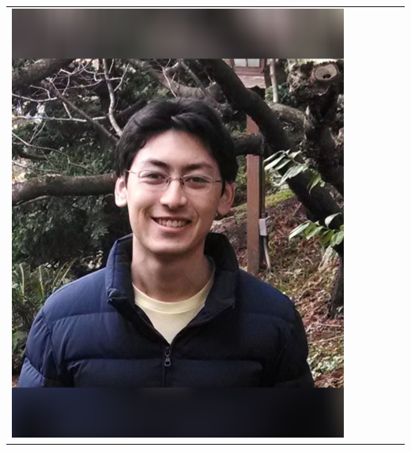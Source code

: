 \documentclass[landscape,a0paper,fontscale=0.292]{baposter}
\begin{document}
\begin{poster}
{\begin{center}
\begin{tabularx}{\linewidth}{X X X X X X}
{\centering \includegraphics[width=0.6\linewidth]{araki.jpg}}\\ 


\end{tabularx}
\end{center}}
\end{poster}
\end{document}
